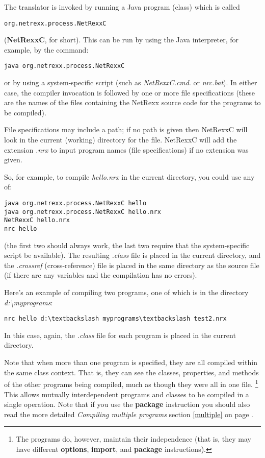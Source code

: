 The translator is invoked by running a Java program (class) which is
called 
\begin{verbatim}
org.netrexx.process.NetRexxC
\end{verbatim}  
(\textbf{NetRexxC}, for short). This can be run by using the Java interpreter, for example,
by the command:
\begin{verbatim}
java org.netrexx.process.NetRexxC
\end{verbatim}
or by using a system-specific script (such as \emph{NetRexxC.cmd}.
or \emph{nrc.bat}).  In either case, the compiler invocation is followed
by one or more file specifications (these are the names of the files
containing the NetRexx source code for the programs to be compiled).

File specifications may include a path; if no path is given then
NetRexxC will look in the current (working) directory for the file.
NetRexxC will add the extension \emph{.nrx} to input program names (file
specifications) if no extension was given.

So, for example, to compile \emph{hello.nrx} in the current directory,
you could use any of:
\begin{verbatim}
java org.netrexx.process.NetRexxC hello
java org.netrexx.process.NetRexxC hello.nrx
NetRexxC hello.nrx
nrc hello
\end{verbatim}
(the first two should always work, the last two require that the
system-specific script be available).  The resulting \emph{.class} file
is placed in the current directory, and the \emph{.crossref}
(cross-reference) file is placed in the same directory as the source
file (if there are any variables and the compilation has no errors).

Here's an example of compiling two programs, one of which is in the
directory \emph{d:\textbackslash myprograms}:
\begin{verbatim}
nrc hello d:\textbackslash myprograms\textbackslash test2.nrx
\end{verbatim}

In this case, again, the \emph{.class} file for each program is placed
in the current directory.

Note that when more than one program is specified, they are all compiled
within the same class context.  That is, they can see the
classes, properties, and methods of the other programs being compiled,
much as though they were all in one file.
\footnote{The programs do, however, maintain their independence (that is, they may
have different \textbf{options}, \textbf{import}, and \textbf{package}
instructions).}
This allows mutually interdependent programs and classes to be compiled
in a single operation.
Note that if you use the \textbf{package} instruction you should also
read the more detailed \emph{Compiling multiple
programs} section \ref{multiple} on page \pageref{multiple}.


